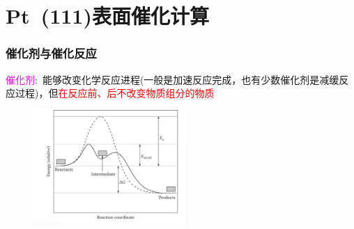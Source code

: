 \section{{\rm Pt~(111)}表面催化计算}
\frame
{
	\frametitle{催化剂与催化反应}
	\textcolor{magenta}{催化剂}:~能够改变化学反应进程(一般是加速反应完成，也有少数催化剂是减缓反应过程)，但\textcolor{red}{在反应前、后不改变物质组分的物质}%
\vskip 3pt
{\fontsize{7.2pt}{5.2pt}}%
\begin{figure}[h!]
\centering
\includegraphics[height=1.7in,viewport=0 0 850 660,clip]{Figures/Pt_NEB-reaction.png}
\caption{\fontsize{6.2pt}{5.2pt}\selectfont{催化剂的存在对反应通道的能量影响(反应通道)的示意图.}}%
\label{Pt_NEB-reaction}
\end{figure} 
}


